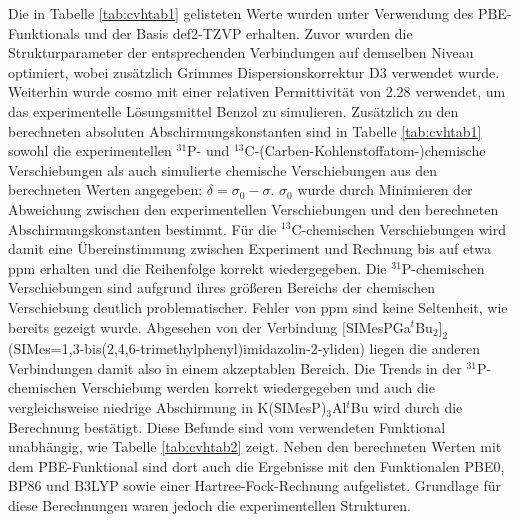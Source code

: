 Die in Tabelle \ref{tab:cvhtab1} gelisteten Werte wurden unter Verwendung des PBE-Funktionals\supercite{perdew1996generalized} und der Basis def2-TZVP\supercite{weigend2005balanced} erhalten. Zuvor wurden die Strukturparameter der entsprechenden Verbindungen auf demselben Niveau optimiert, wobei zusätzlich Grimmes Dispersionskorrektur D3\supercite{grimme2010consistent,grimme2011effect} verwendet wurde. Weiterhin wurde \ac{cosmo}\supercite{klamt1993cosmo} mit einer relativen Permittivität von 2.28\supercite{maryott1951table} verwendet, um das experimentelle Lösungsmittel Benzol zu simulieren. Zusätzlich zu den berechneten absoluten Abschirmungskonstanten sind in Tabelle \ref{tab:cvhtab1} sowohl die experimentellen $^{31}$P- und $^{13}$C-(Carben-Kohlenstoffatom-)chemische Verschiebungen als auch simulierte chemische Verschiebungen aus den berechneten Werten angegeben: $\delta=\sigma_0-\sigma$. $\sigma_0$ wurde durch Minimieren der Abweichung zwischen den experimentellen Verschiebungen und den berechneten Abschirmungskonstanten bestimmt. Für die $^{13}$C-chemischen Verschiebungen wird damit eine Übereinstimmung zwischen Experiment und Rechnung bis auf etwa \unit[2]{ppm} erhalten und die Reihenfolge korrekt wiedergegeben. Die $^{31}$P-chemischen Verschiebungen sind aufgrund ihres größeren Bereichs der chemischen Verschiebung deutlich problematischer. Fehler von \unit[30]{ppm} sind keine Seltenheit, wie bereits gezeigt wurde.\supercite{latypov2015quantum,reiter2017calculation} Abgesehen von der Verbindung $[$SIMesPGa$^\textit{t}$Bu$_2]_2$ \mbox{(SIMes=1,3-bis(2,4,6-tri\-me\-thyl\-phe\-nyl)imi\-da\-zo\-lin-2-yli\-den)} liegen die anderen Verbindungen damit also in einem akzeptablen Bereich. Die Trends in der $^{31}$P-chemischen Verschiebung werden korrekt wiedergegeben und auch die vergleichsweise niedrige Abschirmung in K(SIMesP)$_3$Al$^\textit{t}$Bu wird durch die Berechnung bestätigt. Diese Befunde sind vom verwendeten Funktional unabhängig, wie Tabelle \ref{tab:cvhtab2} zeigt. Neben den berechneten Werten mit dem PBE-Funktional sind dort auch die Ergebnisse mit den Funktionalen PBE0,\supercite{adamo1999toward} BP86\supercite{perdew1986density,becke1988density} und B3LYP\supercite{becke1993density,lee1988development,stephens1994ab} sowie einer Hartree-Fock-Rechnung aufgelistet. Grundlage für diese Berechnungen waren jedoch die experimentellen Strukturen.

